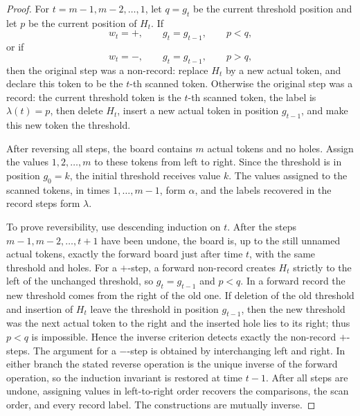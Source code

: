 \documentclass[10pt,a4paper]{amsart}
\begin{document}
\begin{proof}
For \(t=m-1,m-2,\ldots,1\), let \(q=g_t\) be the current threshold position
and let \(p\) be the current position of \(H_t\).  If
\[
w_t=+,\qquad g_t=g_{t-1},\qquad p<q,
\]
or if
\[
w_t=-,\qquad g_t=g_{t-1},\qquad p>q,
\]
then the original step was a non-record: replace \(H_t\) by a new actual
token, and declare this token to be the \(t\)-th scanned token.  Otherwise the
original step was a record: the current threshold token is the \(t\)-th scanned
token, the label is $\lambda(t)=p$, then delete \(H_t\), insert a new actual token in position \(g_{t-1}\), and
make this new token the threshold.

After reversing all steps, the board contains \(m\) actual tokens and no holes.
Assign the values \(1,2,\ldots,m\) to these tokens from left to right.  Since
the threshold is in position \(g_0=k\), the initial threshold receives value
\(k\).  The values assigned to the scanned tokens, in times
\(1,\ldots,m-1\), form \(\alpha\), and the labels recovered in the record
steps form \(\lambda\).

To prove reversibility, use descending induction on \(t\).  After the steps
\(m-1,m-2,\ldots,t+1\) have been undone, the board is, up to the still unnamed
actual tokens, exactly the forward board just after time \(t\), with the same
threshold and holes.  For a \(+\)-step, a forward non-record creates \(H_t\)
strictly to the left of the unchanged threshold, so
\(g_t=g_{t-1}\) and \(p<q\).  In a forward record the new threshold comes from
the right of the old one.  If deletion of the old threshold and insertion of
\(H_t\) leave the threshold in position \(g_{t-1}\), then the new threshold
was the next actual token to the right and the inserted hole lies to its right;
thus \(p<q\) is impossible.  Hence the inverse criterion detects exactly the
non-record \(+\)-steps.  The argument for a \(-\)-step is obtained by
interchanging left and right.  In either branch the stated reverse operation
is the unique inverse of the forward operation, so the induction invariant is
restored at time \(t-1\).  After all steps are undone, assigning values in
left-to-right order recovers the comparisons, the scan order, and every record
label.  The constructions are mutually inverse.
\end{proof}
\end{document}
